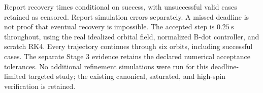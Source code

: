 Report recovery times conditional on success, with unsuccessful valid cases
retained as censored. Report simulation errors separately. A missed deadline
is not proof that eventual recovery is impossible. The accepted step is
$0.25\ \mathrm{s}$ throughout, using the real idealized orbital field,
normalized B-dot controller, and scratch RK4. Every trajectory continues
through six orbits, including successful cases. The separate Stage 3
evidence retains the declared numerical acceptance tolerances. No additional
refinement simulations were run for this deadline-limited targeted study;
the existing canonical, saturated, and high-spin verification is retained.
